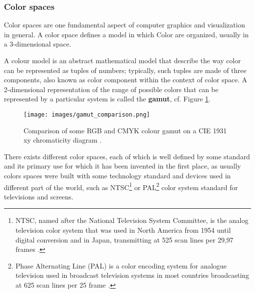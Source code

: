 \documentclass[12pt,a4paper]{extarticle}
\newcommand{\linespace}{\vspace{8pt}}
\begin{document}
\subsubsection{Color spaces} %
Color spaces are one fundamental aspect of computer graphics and visualization in general. A color space defines a model in which Color are organized, usually in a 3-dimensional space.
\linespace

A colour model is an abstract mathematical model that describe the way color can be represented as tuples of numbers; typically, such tuples are made of three components, also known as color component within the context of color space.
A 2-dimensional representation of the range of possible colors that can be represented by a particular system is called the \textbf{gamut}, cf. Figure \ref{fig:gamut}.

\begin{figure}[hbtp]
\centering
\texttt{[image: images/gamut\_comparison.png]}
\caption{Comparison of some RGB and CMYK colour gamut on a CIE 1931 xy chromaticity diagram \cite{wiki_gamut:1}.}
\label{fig:gamut}
\end{figure}


There exists different color spaces, each of which is well defined by some standard and its primary use for which it has been invented in the first place, as usually colors spaces were built with some technology standard and devices used in different part of the world, such as NTSC\footnote{NTSC, named after the National Television System Committee, is the analog television color system that was used in North America from 1954 until digital conversion and in Japan, transmitting at 525 scan lines per 29,97 frames \cite{wiki_ntsc:1}.} or PAL\footnote{Phase Alternating Line (PAL) is a color encoding system for analogue television used in broadcast television systems in most countries broadcasting at 625 scan lines per 25 frame \cite{wiki_pal:1}.} color system standard for televisions and screens.
\linespace
\end{document}
